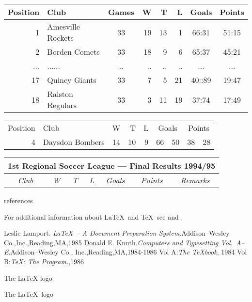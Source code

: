 \documentclass[12pt,twoside,a4paper]{article}   %
\begin{document}
	\begin{tabular}{|r|l||c|rrr|c|c|}\hline
	Position & Club & Games & W & T & L & Goals & Points\\[0.5ex]
	\hline\hline
	1 & Amesville Rockets & 33 & 19 & 13 & 1 & 66:31 & 51:15 \\
	\hline
	2 & Borden Comets     & 33 & 18 &  9 & 6 & 65:37 & 45:21 \\
	\hline
	... & ......          & .. & .. & .. & .. &...   & ...   \\
	\hline
	17 & Quincy Giants    & 33 & 7  & 5  & 21 & 40::89 & 19:47 \\
	\hline
	18 & Ralston Regulars & 33 & 3  & 11 & 19 & 37:74 & 17:49 \\
	\hline
	\end{tabular}
	\begin{tabular}{|r|l||@{ 33 }|rrr|r@{:}l|r@{:}l|}\hline
	Position & Club & W & T & L & \multicolumn{2}{c}{Goals} & \multicolumn{2}{c}{Points}\\[0.5ex]
	4 & Daysdon Bombers     & 14 & 10 &  9 & 66 & 50 & 38 & 28 \\
	\hline
	\end{tabular}
	\begin{tabular}{|r|l||rrr|r@{:}l|r@{:}l|||c|}\hline
	\multicolumn{10}{|c|}{\bfseries 1st Regional Soccer League --- Final Results 1994/95} \\ \hline
	& \itshape Club & \itshape W & \itshape T & \itshape L & \multicolumn{2}{c}{\itshape Goals} & \multicolumn{2}{c}{\itshape Points} & \itshape Remarks \\ \hline\hline
	\end{tabular}
	\newpage
	\begin{thebibliography}{+} %
		references
	\end{thebibliography}
	\newpage
	For additional information about \LaTeX\ and \TeX\ see \cite{lamport} and \cite{knuth, knuth:a}.
	\begin{thebibliography}{99}
		 Leslie Lamport. \textsl{\LaTeX\ -- A Document Preparation System}.Addison--Wesley Co.,Inc.,Reading,MA,1985
		 Donald E. Knuth.\textsl{Computers and Typesetting Vol.\ A--E}.Addison--Wesley Co., Inc.,Reading,MA,1984-1986
		 Vol A:\textsl{The \TeX book}, 1984
		 Vol B:\textsl{\TeX: The Program.},1986
	\end{thebibliography}
	\newpage
	The \LaTeX{} logo

	The \LaTeX\ logo
\end{document}
